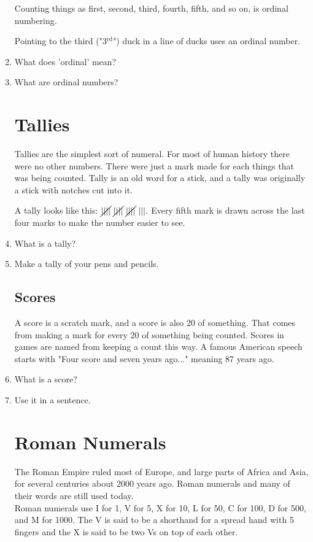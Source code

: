 \documentclass{article}
\begin{document}
\begin{enumerate}
Counting things as first, second, third, fourth, fifth, and so on, is ordinal numbering.

Pointing to the third ("$3{^{\textrm{rd}}}$") duck in a line of ducks uses an ordinal number.

\item What does 'ordinal' mean?
\item What are ordinal numbers?

\newpage

\section*{Tallies} Tallies are the simplest sort of numeral. For most of human history there were no other numbers. There were just a mark made for each things that was being counted. Tally is an old word for a stick, and a tally was originally a stick with notches cut into it.

A tally looks like this: $\cancel{||||}\ \cancel{||||}\ \cancel{||||}\ |||.$ Every fifth mark is drawn across the last four marks to make the number easier to see.

\item What is a tally?
\item Make a tally of your pens and pencils.

\subsection*{Scores}
A score is a scratch mark, and a score is also 20 of something. That comes from making a mark for every 20 of something being counted. Scores in games are named from keeping a count this way. A famous American speech starts with "Four score and seven years ago..." meaning 87 years ago.

\item What is a score?
\item Use it in a sentence.

\newpage

\section*{Roman Numerals} The Roman Empire ruled most of Europe, and large parts of Africa and Asia, for several centuries about 2000 years ago. Roman numerals and many of their words are still used today.\\

Roman numerals use I for 1, V for 5, X for 10, L for 50, C for 100, D for 500, and M for 1000. The V is said to be a shorthand for a spread hand with 5 fingers and the X is said to be two Vs on top of each other.\\


\end{enumerate}
\end{document}
